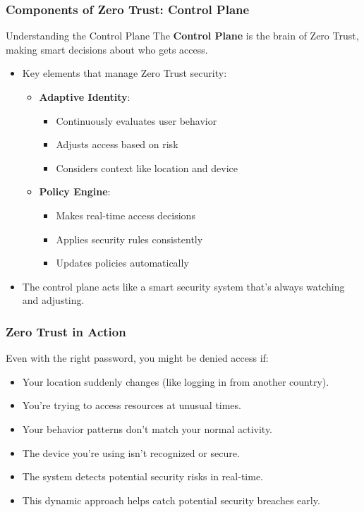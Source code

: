 \documentclass{beamer}
\begin{document}
\begin{frame}
    \frametitle{Components of Zero Trust: Control Plane}

    \begin{block}{Understanding the Control Plane}
        The \textbf{Control Plane} is the brain of Zero Trust, making smart decisions about who gets access. 
    \end{block}

    \begin{itemize}
        \item Key elements that manage Zero Trust security:
            \begin{itemize}
                \item \textbf{Adaptive Identity}:
                    \begin{itemize}
                        \item Continuously evaluates user behavior
                        \item Adjusts access based on risk
                        \item Considers context like location and device
                    \end{itemize}
                \item \textbf{Policy Engine}:
                    \begin{itemize}
                        \item Makes real-time access decisions
                        \item Applies security rules consistently
                        \item Updates policies automatically
                    \end{itemize}
            \end{itemize}
        \item The control plane acts like a smart security system that's always watching and adjusting.
    \end{itemize}
\end{frame}

\begin{frame}
    \frametitle{Zero Trust in Action}
    Even with the right password, you might be denied access if:
    \begin{itemize}
        \item Your location suddenly changes (like logging in from another country).
        \item You're trying to access resources at unusual times.
        \item Your behavior patterns don't match your normal activity.
        \item The device you're using isn't recognized or secure.
        \item The system detects potential security risks in real-time.
        \item This dynamic approach helps catch potential security breaches early.
    \end{itemize}
\end{frame}
\end{document}
